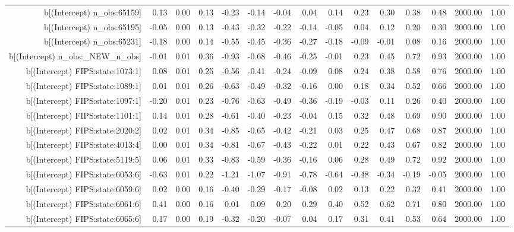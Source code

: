 \begin{table}[ht]
\begin{tabular}{rrrrrrrrrrrrrrr}
  b[(Intercept) n\_obs:65159] & 0.13 & 0.00 & 0.13 & -0.23 & -0.14 & -0.04 & 0.04 & 0.14 & 0.23 & 0.30 & 0.38 & 0.48 & 2000.00 & 1.00 \\ 
  b[(Intercept) n\_obs:65195] & -0.05 & 0.00 & 0.13 & -0.43 & -0.32 & -0.22 & -0.14 & -0.05 & 0.04 & 0.12 & 0.20 & 0.30 & 2000.00 & 1.00 \\ 
  b[(Intercept) n\_obs:65231] & -0.18 & 0.00 & 0.14 & -0.55 & -0.45 & -0.36 & -0.27 & -0.18 & -0.09 & -0.01 & 0.08 & 0.16 & 2000.00 & 1.00 \\ 
  b[(Intercept) n\_obs:\_NEW\_n\_obs] & -0.01 & 0.01 & 0.36 & -0.93 & -0.68 & -0.46 & -0.25 & -0.01 & 0.23 & 0.45 & 0.72 & 0.93 & 2000.00 & 1.00 \\ 
  b[(Intercept) FIPS:state:1073:1] & 0.08 & 0.01 & 0.25 & -0.56 & -0.41 & -0.24 & -0.09 & 0.08 & 0.24 & 0.38 & 0.58 & 0.76 & 2000.00 & 1.00 \\ 
  b[(Intercept) FIPS:state:1089:1] & 0.01 & 0.01 & 0.26 & -0.63 & -0.49 & -0.32 & -0.16 & 0.00 & 0.18 & 0.34 & 0.52 & 0.66 & 2000.00 & 1.00 \\ 
  b[(Intercept) FIPS:state:1097:1] & -0.20 & 0.01 & 0.23 & -0.76 & -0.63 & -0.49 & -0.36 & -0.19 & -0.03 & 0.11 & 0.26 & 0.40 & 2000.00 & 1.00 \\ 
  b[(Intercept) FIPS:state:1101:1] & 0.14 & 0.01 & 0.28 & -0.61 & -0.40 & -0.23 & -0.04 & 0.15 & 0.32 & 0.48 & 0.69 & 0.90 & 2000.00 & 1.00 \\ 
  b[(Intercept) FIPS:state:2020:2] & 0.02 & 0.01 & 0.34 & -0.85 & -0.65 & -0.42 & -0.21 & 0.03 & 0.25 & 0.47 & 0.68 & 0.87 & 2000.00 & 1.00 \\ 
  b[(Intercept) FIPS:state:4013:4] & 0.00 & 0.01 & 0.34 & -0.81 & -0.67 & -0.43 & -0.22 & 0.01 & 0.22 & 0.43 & 0.67 & 0.82 & 2000.00 & 1.00 \\ 
  b[(Intercept) FIPS:state:5119:5] & 0.06 & 0.01 & 0.33 & -0.83 & -0.59 & -0.36 & -0.16 & 0.06 & 0.28 & 0.49 & 0.72 & 0.92 & 2000.00 & 1.00 \\ 
  b[(Intercept) FIPS:state:6053:6] & -0.63 & 0.01 & 0.22 & -1.21 & -1.07 & -0.91 & -0.78 & -0.64 & -0.48 & -0.34 & -0.19 & -0.05 & 2000.00 & 1.00 \\ 
  b[(Intercept) FIPS:state:6059:6] & 0.02 & 0.00 & 0.16 & -0.40 & -0.29 & -0.17 & -0.08 & 0.02 & 0.13 & 0.22 & 0.32 & 0.41 & 2000.00 & 1.00 \\ 
  b[(Intercept) FIPS:state:6061:6] & 0.41 & 0.00 & 0.16 & 0.01 & 0.09 & 0.20 & 0.29 & 0.40 & 0.52 & 0.62 & 0.71 & 0.80 & 2000.00 & 1.00 \\ 
  b[(Intercept) FIPS:state:6065:6] & 0.17 & 0.00 & 0.19 & -0.32 & -0.20 & -0.07 & 0.04 & 0.17 & 0.31 & 0.41 & 0.53 & 0.64 & 2000.00 & 1.00 \\ 

\end{tabular}
\end{table}
